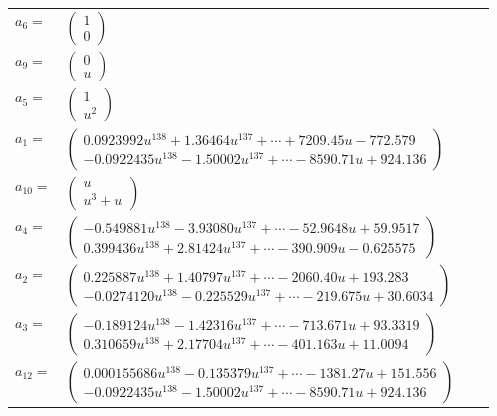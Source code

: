 \documentclass[1p]{elsarticle_modified}
\theoremstyle{definition}
\begin{document}
\begin{tabular}{m{7pt} m{180pt} m{7pt} m{180pt} }
\flushright $a_{6}=$&$\begin{pmatrix}1\\0\end{pmatrix}$ \\
\flushright $a_{9}=$&$\begin{pmatrix}0\\u\end{pmatrix}$ \\
\flushright $a_{5}=$&$\begin{pmatrix}1\\u^2\end{pmatrix}$ \\
\flushright $a_{1}=$&$\begin{pmatrix}0.0923992 u^{138}+1.36464 u^{137}+\cdots+7209.45 u-772.579\\-0.0922435 u^{138}-1.50002 u^{137}+\cdots-8590.71 u+924.136\end{pmatrix}$ \\
\flushright $a_{10}=$&$\begin{pmatrix}u\\u^3+u\end{pmatrix}$ \\
\flushright $a_{4}=$&$\begin{pmatrix}-0.549881 u^{138}-3.93080 u^{137}+\cdots-52.9648 u+59.9517\\0.399436 u^{138}+2.81424 u^{137}+\cdots-390.909 u-0.625575\end{pmatrix}$ \\
\flushright $a_{2}=$&$\begin{pmatrix}0.225887 u^{138}+1.40797 u^{137}+\cdots-2060.40 u+193.283\\-0.0274120 u^{138}-0.225529 u^{137}+\cdots-219.675 u+30.6034\end{pmatrix}$ \\
\flushright $a_{3}=$&$\begin{pmatrix}-0.189124 u^{138}-1.42316 u^{137}+\cdots-713.671 u+93.3319\\0.310659 u^{138}+2.17704 u^{137}+\cdots-401.163 u+11.0094\end{pmatrix}$ \\
\flushright $a_{12}=$&$\begin{pmatrix}0.000155686 u^{138}-0.135379 u^{137}+\cdots-1381.27 u+151.556\\-0.0922435 u^{138}-1.50002 u^{137}+\cdots-8590.71 u+924.136\end{pmatrix}$ \\

\end{tabular}
\end{document}

